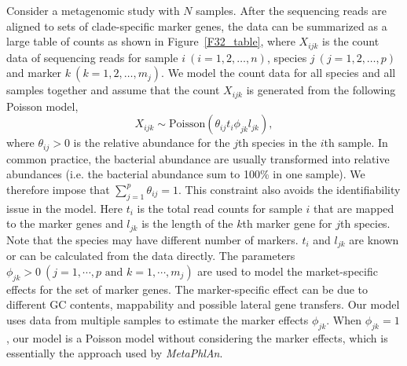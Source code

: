 Consider a metagenomic study with $N$ samples. After the sequencing reads are aligned to sets of clade-specific marker genes, the data can be summarized as a large table of counts as shown in Figure~\ref{F32_table}, where $X_{ijk}$ is  the count data of sequencing reads  for sample $i~(i = 1,2,\ldots,n)$, species $j~(j = 1,2,\ldots,p)$ and marker $k~(k = 1,2,\ldots,m_j)$. 
We model the count data for all species and all samples together and assume that the count  $X_{ijk}$ is generated from the following Poisson model,
\begin{equation*}
X_{ijk} \sim \mbox{Poisson}(\theta_{ij}t_{i}\phi_{jk}l_{jk}),
\end{equation*}
where $\theta_{ij} > 0$ is the relative abundance for the $j$th species in the $i$th sample. In common practice, the bacterial abundance are usually transformed into relative abundances (i.e. the bacterial abundance sum to 100\% in one sample).  We therefore impose that  $\sum_{j=1}^{p} \theta_{ij} = 1$. This constraint also avoids the identifiability issue in the model.  Here $t_i$ is the total read counts for sample $i$ that are mapped to the marker genes and $l_{jk}$ is the  length of the $k$th marker gene for $j$th species. Note that the species may have different number of markers. $t_i$ and $l_{jk}$ are known or can be calculated from the data directly.  The parameters $\phi_{jk} >0 ~(j=1, \cdots, p \textrm{ and } k=1,\cdots, m_j)$ are used to model  the market-specific effects for the set of  marker genes. The marker-specific effect can  be due to different GC contents, mappability and possible lateral gene transfers.  Our model uses data from multiple samples to estimate the marker effects $\phi_{jk}$.  When $\phi_{jk}=1$, our model is a Poisson model without considering the marker effects, which is essentially the approach used by {\it MetaPhlAn}.


